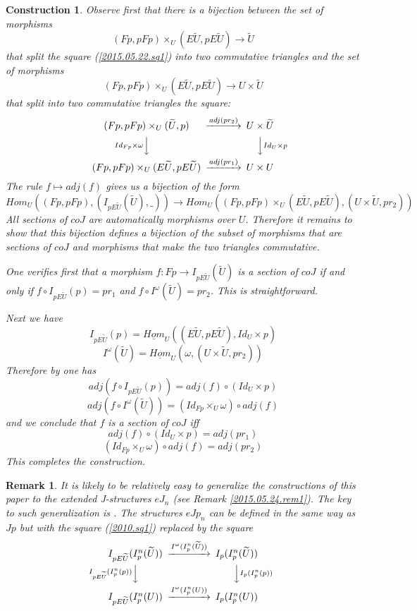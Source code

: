 \documentclass[12pt]{article}
\newenvironment{eq}{\begin{equation}}{\end{equation}}
\newtheorem{remark}[proposition]{Remark}
\newtheorem{construction}[proposition]{Construction}
\newcommand{\llabel}[1]{\label{#1}}
\newcommand{\sr}{\rightarrow}
\newcommand{\uu}{\underline}
\newcommand{\wt}{\widetilde}
\begin{document}
\begin{construction}\rm
\llabel{2015.05.22.constr1}
Observe first that there is a bijection between the set of morphisms 
%
$$(Fp,pFp)\times_U(E\wt{U},pE\wt{U})\sr \wt{U}$$
%
that split the square (\ref{2015.05.22.sq1}) into two commutative triangles and the set of morphisms 
%
$$(Fp,pFp)\times_U(E\wt{U},pE\wt{U})\sr U\times\wt{U}$$
%
that split into two commutative triangles the square:
%
$$
\begin{CD}
(Fp,pFp)\times_U(\wt{U},p) @>adj(pr_2)>> U\times\wt{U}\\
@VId_{Fp}\times \omega VV @VV Id_U\times p V\\
(Fp,pFp)\times_U(E\wt{U},pE\wt{U}) @>adj(pr_1)>> U\times U
\end{CD}
$$
%
The rule $f\mapsto adj(f)$ gives us a bijection of the form
%
$$Hom_U((Fp,pFp),(I_{pE\wt{U}}(\wt{U}),\_))\sr Hom_U((Fp,pFp)\times_U (E\wt{U},pE\wt{U}), (U\times\wt{U}, pr_2))$$
%
All sections of $coJ$ are automatically morphisms over $U$. Therefore it remains to show that this bijection defines a bijection of the subset of morphisms that are sections of $coJ$ and morphisms that make the two triangles commutative. 

One verifies first that a morphism $f:Fp\sr I_{pE\wt{U}}(\wt{U})$ is a section of $coJ$ if and only if $f\circ I_{pE\wt{U}}(p)=pr_1$ and $f\circ I^{\omega}(\wt{U})=pr_2$. This is straightforward. 

Next we have
%
$$I_{pE\wt{U}}(p)=\uu{Hom}_U((E\wt{U},pE\wt{U}),Id_U\times p)$$
$$I^{\omega}(\wt{U})=\uu{Hom}_U(\omega,(U\times\wt{U},pr_2))$$
%
Therefore by \cite[Lemma 8.7]{fromunivwithPi} one has
%
$$adj(f\circ I_{pE\wt{U}}(p))=adj(f)\circ (Id_U\times p)$$
$$adj(f\circ I^{\omega}(\wt{U}))=(Id_{Fp}\times_{U}\omega)\circ adj(f)$$
%
and we conclude that $f$ is a section of $coJ$ iff 
%
$$adj(f)\circ (Id_U\times p)=adj(pr_1)$$
$$(Id_{Fp}\times_{U}\omega)\circ adj(f)=adj(pr_2)$$
% 
This completes the construction.
\end{construction}
%
\begin{remark}\rm
\llabel{2015.05.24.rem2}
It is likely to be relatively easy to generalize the constructions of this  paper to the extended J-structures $eJ_n$ (see Remark \ref{2015.05.24.rem1}). The key to such generalization is \cite[Remark 3.13]{fromunivwithPi}. The structures $eJp_n$ can be defined in the same way as $Jp$ but with the square (\ref{2010.sq1}) replaced by the square
%
\begin{eq}
\llabel{2015.05.24.sq1}
\begin{CD}
I_{pE\wt{U}}(I_p^n(\wt{U})) @>I^{\omega}(I_p^n(\wt{U}))>> I_p(I_p^n(\wt{U}))\\
@VI_{pE\wt{U}}(I_p^n(p)) VV @VV I_p(I_p^n(p))V\\
I_{pE\wt{U}}(I_p^n(U)) @>I^{\omega}(I_p^n(U))>> I_p(I_p^n(U))
\end{CD}
\end{eq}
\end{remark}
%
\end{document}
